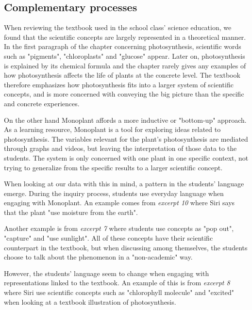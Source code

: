 \subsection{Complementary processes}
When reviewing the textbook used in the school class' science education, we found that the scientific concepts are largely represented in a theoretical manner. In the first paragraph of the chapter concerning photosynthesis, scientific words such as "pigments", "chloroplasts" and "glucose" appear. Later on, photosynthesis is explained by its chemical formula and the chapter rarely gives any examples of how photosynthesis affects the life of plants at the concrete level. The textbook therefore emphasizes how photosynthesis fits into a larger system of scientific concepts, and is more concerned with conveying the big picture than the specific and concrete experiences. 

On the other hand Monoplant affords a more inductive or "bottom-up" approach. As a learning resource, Monoplant is a tool for exploring ideas related to photosynthesis. The variables relevant for the plant's photosynthesis are mediated through graphs and videos, but leaving the interpretation of those data to the students. The system is only concerned with one plant in one specific context, not trying to generalize from the specific results to a larger scientific concept. 

When looking at our data with this in mind, a pattern in the students' language emerge. During the inquiry process, students use everyday language when engaging with Monoplant. An example comes from \emph{excerpt 10} where Siri says that the plant "use moisture from the earth". 

Another example is from \emph{excerpt 7} where students use concepts as "pop out", "capture" and "use sunlight". All of these concepts have their scientific counterpart in the textbook, but when discussing among themselves, the students choose to talk about the phenomenon in a "non-academic" way. 

However, the students' language seem to change when engaging with representations linked to the textbook. An example of this is from \emph{excerpt 8} where Siri use scientific concepts such as "chlorophyll molecule" and "excited" when looking at a textbook illustration of photosynthesis. 

